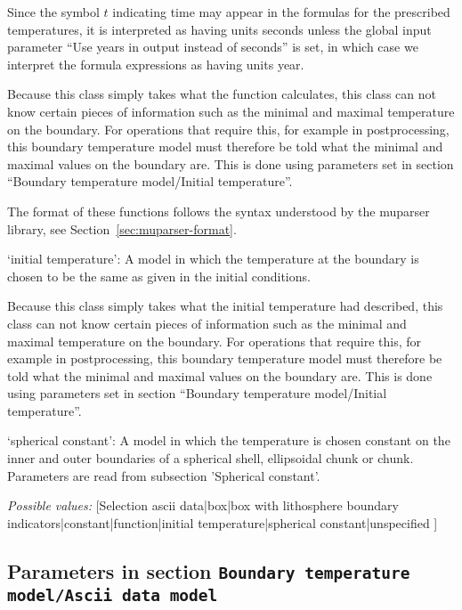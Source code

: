 \begin{itemize}
Since the symbol $t$ indicating time may appear in the formulas for the prescribed temperatures, it is interpreted as having units seconds unless the global input parameter ``Use years in output instead of seconds'' is set, in which case we interpret the formula expressions as having units year.

Because this class simply takes what the function calculates, this class can not know certain pieces of information such as the minimal and maximal temperature on the boundary. For operations that require this, for example in postprocessing, this boundary temperature model must therefore be told what the minimal and maximal values on the boundary are. This is done using parameters set in section ``Boundary temperature model/Initial temperature''.

The format of these functions follows the syntax understood by the muparser library, see Section~\ref{sec:muparser-format}.

`initial temperature': A model in which the temperature at the boundary is chosen to be the same as given in the initial conditions.

Because this class simply takes what the initial temperature had described, this class can not know certain pieces of information such as the minimal and maximal temperature on the boundary. For operations that require this, for example in postprocessing, this boundary temperature model must therefore be told what the minimal and maximal values on the boundary are. This is done using parameters set in section ``Boundary temperature model/Initial temperature''.

`spherical constant': A model in which the temperature is chosen constant on the inner and outer boundaries of a spherical shell, ellipsoidal chunk or chunk. Parameters are read from subsection 'Spherical constant'.


{\it Possible values:} [Selection ascii data|box|box with lithosphere boundary indicators|constant|function|initial temperature|spherical constant|unspecified ]
\end{itemize}



\subsection{Parameters in section \tt Boundary temperature model/Ascii data model}
\label{parameters:Boundary_20temperature_20model/Ascii_20data_20model}

